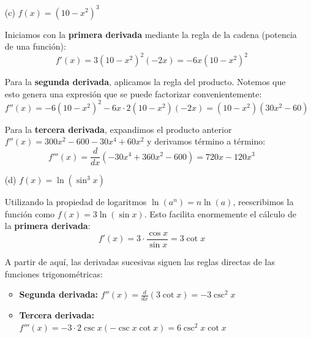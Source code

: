 \documentclass[12pt]{article}
\begin{document}
{\begin{enumerate}
\begin{itemize}
    Aplicando la \textbf{regla del cociente}, obtenemos la primera derivada:
    \[ f'(x) = \frac{3x^2(x-1) - x^3(1)}{(x-1)^2} = \frac{2x^3 - 3x^2}{(x-1)^2} \]
    
    Para la \textbf{segunda derivada}, derivamos el resultado anterior. Tras expandir el numerador y simplificar factores comunes con el denominador, resulta:
    \[ f''(x) = \frac{(6x^2-6x)(x-1)^2 - (2x^3-3x^2)(2(x-1))}{(x-1)^4} = \frac{2x^3 - 6x^2 + 6x}{(x-1)^3} \]
    
    Repitiendo el proceso para la \textbf{tercera derivada}, se observa una simplificación notable que elimina los términos de grado superior:
    \[ f'''(x) = \frac{d}{dx} \left[ \frac{2x^3 - 6x^2 + 6x}{(x-1)^3} \right] = \frac{-6}{(x-1)^4} \]

    \item[(c)] $f(x)=(10-x^2)^3$
    
    Iniciamos con la \textbf{primera derivada} mediante la regla de la cadena (potencia de una función):
    \[ f'(x) = 3(10-x^2)^2(-2x) = -6x(10-x^2)^2 \]
    
    Para la \textbf{segunda derivada}, aplicamos la regla del producto. Notemos que esto genera una expresión que se puede factorizar convenientemente:
    \[ f''(x) = -6(10-x^2)^2 - 6x \cdot 2(10-x^2)(-2x) = (10-x^2)(30x^2-60) \]
    
    Para la \textbf{tercera derivada}, expandimos el producto anterior $f''(x) = 300x^2 - 600 - 30x^4 + 60x^2$ y derivamos término a término:
    \[ f'''(x) = \frac{d}{dx}(-30x^4 + 360x^2 - 600) = 720x - 120x^3 \]

    \item[(d)] $f(x)=\ln(\sin^3 x)$
    
    Utilizando la propiedad de logaritmos $\ln(a^n) = n\ln(a)$, reescribimos la función como $f(x) = 3\ln(\sin x)$. Esto facilita enormemente el cálculo de la \textbf{primera derivada}:
    \[ f'(x) = 3 \cdot \frac{\cos x}{\sin x} = 3\cot x \]
    
    A partir de aquí, las derivadas sucesivas siguen las reglas directas de las funciones trigonométricas:
    \begin{itemize}
        \item \textbf{Segunda derivada:} $f''(x) = \frac{d}{dx}(3\cot x) = -3\csc^2 x$
        \item \textbf{Tercera derivada:} $f'''(x) = -3 \cdot 2\csc x (-\csc x \cot x) = 6\csc^2 x \cot x$
    \end{itemize}
\end{itemize}


\end{enumerate}}
\end{document}
